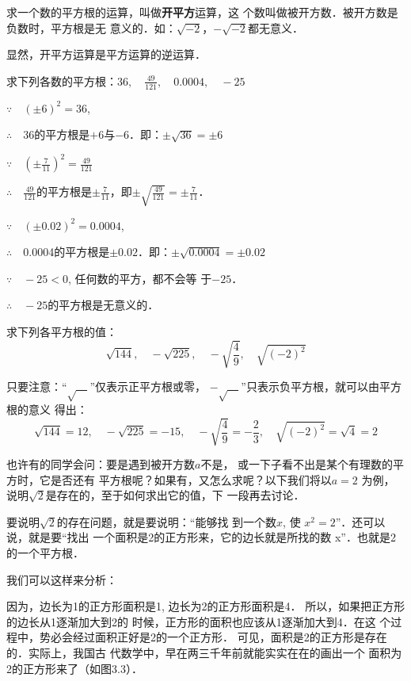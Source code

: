 求一个数的平方根的运算，叫做\textbf{开平方}运算，这
个数叫做被开方数．被开方数是负数时，平方根是无
意义的．如：$\sqrt{-2}$，$-\sqrt{-2}$都无意义．

显然，开平方运算是平方运算的逆运算．

\begin{example}
    求下列各数的平方根：$36,\quad \frac{49}{121},\quad 0.0004,\quad -25$
\end{example}

\begin{solution}
$\because\quad (\pm 6)^2=36$,

$\therefore\quad $36的平方根是$+6$与$-6$．即：$\pm\sqrt{36}=\pm 6$

$\because \quad \left(\pm \frac{7}{11}\right)^2=\frac{49}{121}$

$\therefore\quad \frac{49}{121}$的平方根是$\pm\frac{7}{11}$，即$\pm\sqrt{\frac{49}{121}}=\pm\frac{7}{11}$．

$\because\quad (\pm 0.02)^2=0.0004$,

$\therefore\quad $0.0004的平方根是$\pm 0.02$．即：$\pm\sqrt{0.0004}=\pm 0.02$

$\because\quad -25<0$, 任何数的平方，都不会等
于$-25$．

$\therefore\quad -25$的平方根是无意义的．
\end{solution}

\begin{example}
    求下列各平方根的值：
    \[\sqrt{144},\quad -\sqrt{225},\quad -\sqrt{\frac{4}{9}},\quad \sqrt{(-2)^2}   \]
\end{example}

\begin{solution}
    只要注意：“$\sqrt{\quad}$”仅表示正平方根或零，
    $-\sqrt{\quad}$”只表示负平方根，就可以由平方根的意义
得出：
\[\sqrt{144}=12,\quad -\sqrt{225}=-15,\quad -\sqrt{\frac{4}{9}}=-\frac{2}{3},\quad \sqrt{(-2)^2}=\sqrt{4}=2   \]
\end{solution}
    

也许有的同学会问：要是遇到被开方数$a$不是，
或一下子看不出是某个有理数的平方时，它是否还有
平方根呢？如果有，又怎么求呢？以下我们将以$a=2$
为例，说明$\sqrt{2}$是存在的，至于如何求出它的值，下
一段再去讨论．

要说明$\sqrt{2}$的存在问题，就是要说明：“能够找
到一个数$x$, 使
$x^2=2$”．还可以说，就是要“找出
一个面积是2的正方形来，它的边长就是所找的数
x”．也就是2的一个平方根．

我们可以这样来分析：

因为，边长为1的正方形面积是1,
边长为2的正方形面积是4．
所以，如果把正方形的边长从1逐渐加大到2的
时候，正方形的面积也应该从1逐渐加大到4．在这
个过程中，势必会经过面积正好是2的一个正方形．
可见，面积是2的正方形是存在的．实际上，我国古
代数学中，早在两三千年前就能实实在在的画出一个
面积为2的正方形来了（如图3.3）．



